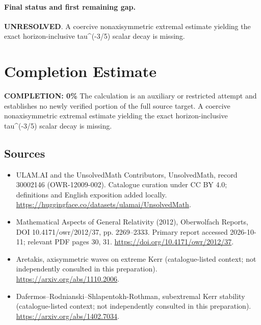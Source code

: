 \documentclass[11pt]{article}
\begin{document}
\paragraph{Final status and first remaining gap.}
\textbf{UNRESOLVED}. A coercive nonaxisymmetric extremal estimate yielding the exact horizon-inclusive tau\textasciicircum{}(-3/5) scalar decay is missing.

\section{Completion Estimate}
\noindent\textbf{COMPLETION: 0\%}
The calculation is an auxiliary or restricted attempt and establishes no newly verified portion of the full source target. A coercive nonaxisymmetric extremal estimate yielding the exact horizon-inclusive tau\textasciicircum{}(-3/5) scalar decay is missing.

\subsection{Sources}
\begin{itemize}
\item[\hypertarget{source:30002146:1}{S1}] ULAM.AI and the UnsolvedMath Contributors, UnsolvedMath, record 30002146 (OWR-12009-002). Catalogue curation under CC BY 4.0; definitions and English exposition added locally.
\url{https://huggingface.co/datasets/ulamai/UnsolvedMath}.
\item[\hypertarget{source:30002146:2}{S2}] Mathematical Aspects of General Relativity (2012), Oberwolfach Reports, DOI 10.4171/owr/2012/37, pp. 2269--2333. Primary report accessed 2026-10-11; relevant PDF pages 30, 31.
\url{https://doi.org/10.4171/owr/2012/37}.
\item[\hypertarget{source:30002146:3}{S3}] Aretakis, axisymmetric waves on extreme Kerr (catalogue-listed context; not independently consulted in this preparation).
\url{https://arxiv.org/abs/1110.2006}.
\item[\hypertarget{source:30002146:4}{S4}] Dafermos--Rodnianski--Shlapentokh-Rothman, subextremal Kerr stability (catalogue-listed context; not independently consulted in this preparation).
\url{https://arxiv.org/abs/1402.7034}.
\end{itemize}
\label{end:30002146}
\end{document}
